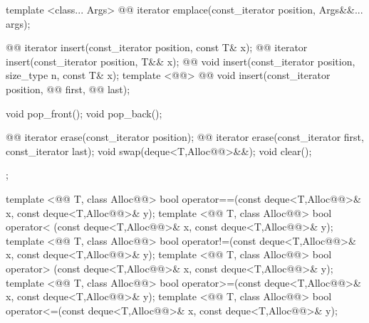 \documentclass[american,twoside]{book}
\begin{document}
\begin{codeblock}
{{    template <class... Args> 
      @@ 
      iterator emplace(const_iterator position, Args&&... args);

    @@
      iterator insert(const_iterator position, const T& x);
    @@
      iterator insert(const_iterator position, T&& x);
    @@
      void insert(const_iterator position, size_type n, const T& x);
    template <@@>
      @@
      void insert(const_iterator position, @@ first, @@ last);

    void pop_front();
    void pop_back();

    @@ iterator erase(const_iterator position);
    @@ iterator erase(const_iterator first, const_iterator last);
    void     swap(deque<T,Alloc@@>&&);
    void     clear();
  };

  template <@@ T, class Alloc@@>
    bool operator==(const deque<T,Alloc@@>& x, const deque<T,Alloc@@>& y);
  template <@@ T, class Alloc@@>
    bool operator< (const deque<T,Alloc@@>& x, const deque<T,Alloc@@>& y);
  template <@@ T, class Alloc@@>
    bool operator!=(const deque<T,Alloc@@>& x, const deque<T,Alloc@@>& y);
  template <@@ T, class Alloc@@>
    bool operator> (const deque<T,Alloc@@>& x, const deque<T,Alloc@@>& y);
  template <@@ T, class Alloc@@>
    bool operator>=(const deque<T,Alloc@@>& x, const deque<T,Alloc@@>& y);
  template <@@ T, class Alloc@@>
    bool operator<=(const deque<T,Alloc@@>& x, const deque<T,Alloc@@>& y);

}
\end{codeblock}
\end{document}
